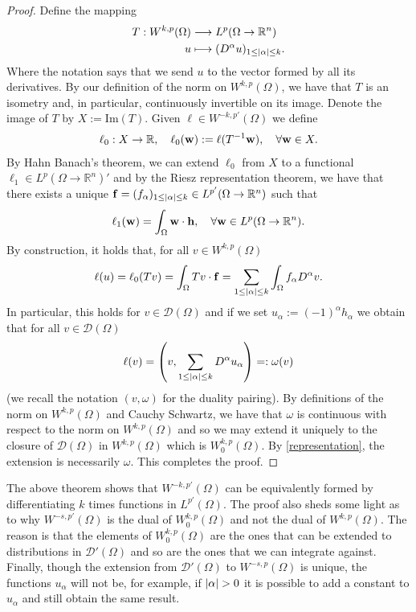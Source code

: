 \documentclass[
    a4paper,
    DIV=14,
    abstract=true,
    numbers=noenddot
]
{scrartcl}
\theoremstyle{definition}
\newcommand{\rm}[1]{\mathrm{#1}}
\newcommand{\R}{\mathbb{R}}
\newcommand{\Dd}{\mathcal{D}}
\begin{document}
\begin{proof}
    Define the mapping
    \begin{align*}
        T: W^{k,p}(\Omega ) & \longrightarrow L^p(\Omega \to \R^n)                \\
        u                   & \longmapsto(D^\alpha u)_{1 \leq\abs{\alpha}\leq k}.
    \end{align*}
    Where the notation says that we send $u$ to the vector formed by all its derivatives. By our definition of the norm on $W^{k,p}(\Omega )$, we have that $T$ is an isometry and, in particular, continuously invertible on its image. Denote the image of $T$ by $X:=\rm{Im}(T)$. Given $\ell \in W^{-k,p'}(\Omega )$ we define
    \begin{align*}
        \ell_0: X \to \R, \quad \ell_0(\vb{w}):= \ell(T^{-1}\vb{w}), \quad \forall \vb{w} \in X.
    \end{align*}
    By Hahn Banach's theorem, we can extend $\ell_0$ from $X$ to a functional $\ell_1 \in  L^p(\Omega \to \R^n)'$ and by the Riesz representation theorem, we have that there exists a unique $\vb{f}=(f_\alpha)_{1\leq \abs{\alpha}\leq k }\in L^{p'}(\Omega \to \R^n)$ such that
    \begin{align*}
        \ell_1(\vb{w})=\int_{\Omega}\vb{w}\cdot \vb{h}, \quad \forall \vb{w} \in L^p(\Omega \to \R^n).
    \end{align*}
    By construction, it holds that, for all $v \in W^{k,p}(\Omega )$
    \begin{align*}
        \ell(u)=\ell_0(Tv)=\int_{\Omega}Tv\cdot \vb{f}=\sum_{1\leq\left| \alpha \right|\leq k}\int_{\Omega}f_\alpha D^\alpha v .
    \end{align*}
    In particular, this holds for $v \in \Dd(\Omega )$ and if we set $u_\alpha:=(-1)^\alpha h_\alpha$ we obtain that for all $v \in \Dd(\Omega )$
    \begin{align}\label{representation}
        \ell(v)=\left(v,\sum_{1\leq\left| \alpha \right|\leq k} D^\alpha u_\alpha\right)=: \omega(v)
    \end{align}
    (we recall the notation $(v,\omega)$ for the duality pairing). By definitions of the norm on $W^{k,p}(\Omega )$ and Cauchy Schwartz, we have that $\omega$ is continuous with respect to the norm on $W^{k,p}(\Omega )$ and so we may extend it uniquely to the closure of $\Dd(\Omega )$ in $W^{k,p}(\Omega )$ which is $W^{k,p}_0(\Omega )$. By \eqref{representation}, the extension is necessarily $\omega$. This completes the proof.
\end{proof}
The above theorem shows that $W^{-k,p'}(\Omega )$ can be equivalently formed by differentiating $k$ times functions in $L^{p'}(\Omega )$. The proof also sheds some light as to why $W^{-s,p'}(\Omega )$ is the dual of $W^{k,p}_0(\Omega )$ and not the dual of $W^{k,p}(\Omega )$. The reason is that the elements of $W^{k,p}_0(\Omega )$ are the ones that can be extended to distributions in $\Dd'(\Omega )$ and so are the ones that we can integrate against. Finally, though the extension from $\Dd'(\Omega )$ to $W^{-s,p}(\Omega )$ is unique, the functions $u_\alpha$ will not be, for example, if $\abs{\alpha}>0$ it is possible to add a constant to $u_\alpha$ and still obtain the same result.
\end{document}
